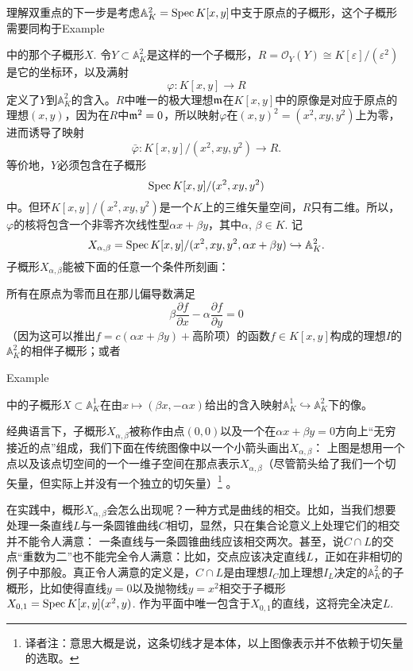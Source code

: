 \begin{exa}[双重点]
理解双重点的下一步是考虑$\mathbb{A}_K^2=\operatorname{Spec} K[x,y]$中支于原点的子概形，这个子概形需要同构于Example {{\addtocounter{thm}{-1}}\thethm{\addtocounter{thm}{1}}}中的那个子概形$X$. 令$Y\subset \mathbb{A}_K^2$是这样的一个子概形，$R=\mathscr{O}_Y(Y)\cong K[\varepsilon]/(\varepsilon^2)$是它的坐标环，以及满射
\[
	\varphi:K[x,y]\to R
\]
定义了$Y$到$\mathbb{A}_K^2$的含入。$R$中唯一的极大理想$\mathfrak{m}$在$K[x,y]$中的原像是对应于原点的理想$(x,y)$，因为在$R$中$\mathfrak{m}^2=0$，所以映射$\varphi$在$(x,y)^2=(x^2,xy,y^2)$上为零，进而诱导了映射
\[
	\bar\varphi:K[x,y]/(x^2,xy,y^2)\to R.
\]
等价地，$Y$必须包含在子概形
\[
	\operatorname{Spec} K[x,y]/(x^2,xy,y^2)
\]
中。但环$K[x,y]/(x^2,xy,y^2)$是一个$K$上的三维矢量空间，$R$只有二维。所以，$\varphi$的核将包含一个非零齐次线性型$\alpha x+\beta y$，其中$\alpha$, $\beta\in K$. 记
\[
	X_{\alpha,\beta}=\operatorname{Spec} K[x,y]/(x^2,xy,y^2,\alpha x+\beta y)\hookrightarrow \mathbb{A}_K^2.
\]
子概形$X_{\alpha,\beta}$能被下面的任意一个条件所刻画：

\begin{compactenum}[(i)]
\item 所有在原点为零而且在那儿偏导数满足
\[
	\beta\frac{\partial f}{\partial x}-\alpha\frac{\partial f}{\partial y}=0
\]
（因为这可以推出$f=c(\alpha x+\beta y)+\text{高阶项}$）的函数$f\in K[x,y]$构成的理想$I$的$\mathbb{A}^2_K$的相伴子概形；或者

\item Example {{\addtocounter{thm}{-1}}\thethm{\addtocounter{thm}{1}}}中的子概形$X\subset \mathbb{A}_K^1$在由$x\mapsto (\beta x,-\alpha x)$给出的含入映射$\mathbb{A}_K^1\hookrightarrow\mathbb{A}_K^2$下的像。
\end{compactenum}

经典语言下，子概形$X_{\alpha,\beta}$被称作由点$(0,0)$以及一个在$\alpha x+\beta y=0$方向上“无穷接近的点”组成，我们下面在传统图像中以一个小箭头画出$X_{\alpha,\beta}$：
上图是想用一个点以及该点切空间的一个一维子空间在那点表示$X_{\alpha,\beta}$（尽管箭头给了我们一个切矢量，但实际上并没有一个独立的切矢量）\footnote{译者注：意思大概是说，这条切线才是本体，以上图像表示并不依赖于切矢量的选取。}
。
\end{exa}

\wrapa

在实践中，概形$X_{\alpha,\beta}$会怎么出现呢？一种方式是曲线的相交。比如，当我们想要处理一条直线$L$与一条圆锥曲线$C$相切，显然，只在集合论意义上处理它们的相交并不能令人满意：
一条直线与一条圆锥曲线应该相交两次。甚至，说$C\cap L$的交点“重数为二”也不能完全令人满意：比如，交点应该决定直线$L$，正如在非相切的例子中那般。真正令人满意的定义是，$C\cap L$是由理想$I_C$加上理想$I_L$决定的$\mathbb{A}_K^2$的子概形，比如使得直线$y=0$以及抛物线$y=x^2$相交于子概形$X_{0,1}=\operatorname{Spec} K[x,y](x^2,y)$. 作为平面中唯一包含于$X_{0,1}$的直线，这将完全决定$L$. 

